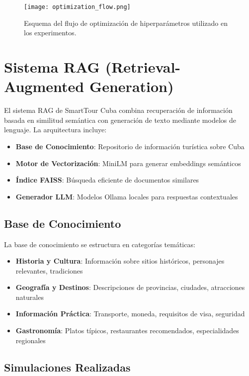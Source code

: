 \documentclass[runningheads]{llncs}
\begin{document}
\begin{figure}[H]
    \centering
    \texttt{[image: optimization\_flow.png]}
    \caption{Esquema del flujo de optimización de hiperparámetros utilizado en los experimentos.}
    \label{fig:optimization_flow}
\end{figure}



\section{Sistema RAG (Retrieval-Augmented Generation)}


El sistema RAG de SmartTour Cuba combina recuperación de información basada en similitud semántica con generación de texto mediante modelos de lenguaje. La arquitectura incluye:

\begin{itemize}
\item \textbf{Base de Conocimiento}: Repositorio de información turística sobre Cuba
\item \textbf{Motor de Vectorización}: MiniLM para generar embeddings semánticos
\item \textbf{Índice FAISS}: Búsqueda eficiente de documentos similares
\item \textbf{Generador LLM}: Modelos Ollama locales para respuestas contextuales
\end{itemize}

\subsection{Base de Conocimiento}

La base de conocimiento se estructura en categorías temáticas:

\begin{itemize}
\item \textbf{Historia y Cultura}: Información sobre sitios históricos, personajes relevantes, tradiciones
\item \textbf{Geografía y Destinos}: Descripciones de provincias, ciudades, atracciones naturales
\item \textbf{Información Práctica}: Transporte, moneda, requisitos de visa, seguridad
\item \textbf{Gastronomía}: Platos típicos, restaurantes recomendados, especialidades regionales
\end{itemize}

\subsection{Simulaciones Realizadas}
\end{document}

